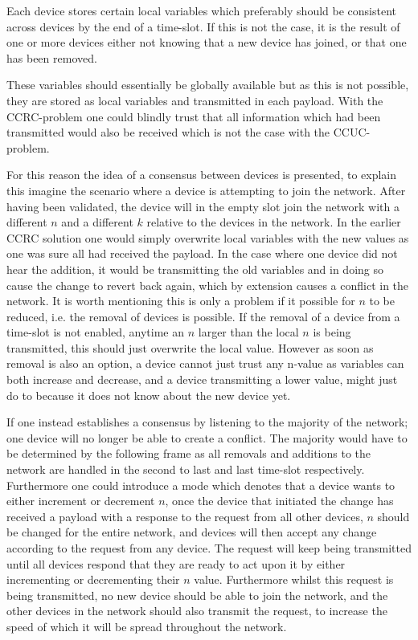 Each device stores certain local variables which preferably should be consistent across devices by the end of a time-slot.
If this is not the case, it is the result of one or more devices either not knowing that a new device has joined, or that one has been removed.

These variables should essentially be globally available but as this is not possible, they are stored as local variables and transmitted in each payload.
With the CCRC-problem one could blindly trust that all information which had been transmitted would also be received which is not the case with the CCUC-problem.

\bigskip \noindent
For this reason the idea of a consensus between devices is presented, to explain this imagine the scenario where a device is attempting to join the network.
After having been validated, the device will in the empty slot join the network with a different $n$ and a different $k$ relative to the devices in the network.
In the earlier CCRC solution one would simply overwrite local variables with the new values as one was sure all had received the payload.
In the case where one device did not hear the addition, it would be transmitting the old variables and in doing so cause the change to revert back again, which by extension causes a conflict in the network.
It is worth mentioning this is only a problem if it possible for $n$ to be reduced, i.e. the removal of devices is possible.
If the removal of a device from a time-slot is not enabled, anytime an $n$ larger than the local $n$ is being transmitted, this should just overwrite the local value. 
However as soon as removal is also an option, a device cannot just trust any n-value as variables can both increase and decrease, and a device transmitting a lower value, might just do to because it does not know about the new device yet.

If one instead establishes a consensus by listening to the majority of the network; one device will no longer be able to create a conflict.
The majority would have to be determined by the following frame as all removals and additions to the network are handled in the second to last and last time-slot respectively.
Furthermore one could introduce a mode which denotes that a device wants to either increment or decrement $n$, once the device that initiated the change has received a payload with a response to the request from all other devices, $n$ should be changed for the entire network, and devices will then accept any change according to the request from any device.
The request will keep being transmitted until all devices respond that they are ready to act upon it by either incrementing or decrementing their $n$ value.
Furthermore whilst this request is being transmitted, no new device should be able to join the network, and the other devices in the network should also transmit the request, to increase the speed of which it will be spread throughout the network.